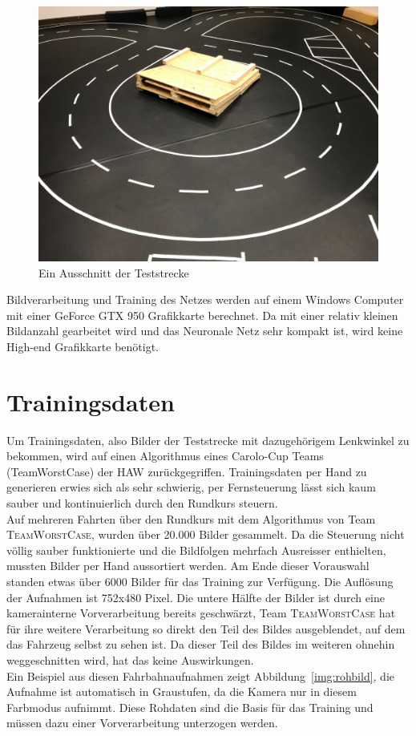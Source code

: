 \begin{figure}[h]
	\centering
	\includegraphics[scale=0.2]{figures/Teststrecke-Ausschnitt.jpg}
	\caption{Ein Ausschnitt der Teststrecke}
	\label{img:teststrecke}
\end{figure}

Bildverarbeitung und Training des Netzes werden auf einem Windows Computer mit einer GeForce GTX 950 Grafikkarte berechnet. Da mit einer relativ kleinen Bildanzahl gearbeitet wird und das Neuronale Netz sehr kompakt ist, wird keine High-end Grafikkarte benötigt.


\section{Trainingsdaten}

Um Trainingsdaten, also Bilder der Teststrecke mit dazugehörigem Lenkwinkel zu bekommen, wird auf einen Algorithmus eines Carolo-Cup Teams (TeamWorstCase) der HAW zurückgegriffen. Trainingsdaten per Hand zu generieren erwies sich als sehr schwierig, per Fernsteuerung lässt sich kaum sauber und kontinuierlich durch den Rundkurs steuern.\\
Auf mehreren Fahrten über den Rundkurs mit dem Algorithmus von Team \textsc{TeamWorstCase}, wurden über 20.000 Bilder gesammelt. Da die Steuerung nicht völlig sauber funktionierte und die Bildfolgen mehrfach Ausreisser enthielten, mussten Bilder per Hand aussortiert werden. Am Ende dieser Vorauswahl standen etwas über 6000 Bilder für das Training zur Verfügung. Die Auflösung der Aufnahmen ist 752x480 Pixel. Die untere Hälfte der Bilder ist durch eine kamerainterne Vorverarbeitung bereits geschwärzt, Team \textsc{TeamWorstCase} hat für ihre weitere Verarbeitung so direkt den Teil des Bildes ausgeblendet, auf dem das Fahrzeug selbst zu sehen ist. Da dieser Teil des Bildes im weiteren ohnehin weggeschnitten wird, hat das keine Auswirkungen. \\
Ein Beispiel aus diesen Fahrbahnaufnahmen zeigt Abbildung~\ref{img:rohbild}, die Aufnahme ist automatisch in Graustufen, da die Kamera nur in diesem Farbmodus aufnimmt.
Diese Rohdaten sind die Basis für das Training und müssen dazu einer Vorverarbeitung unterzogen werden. 

